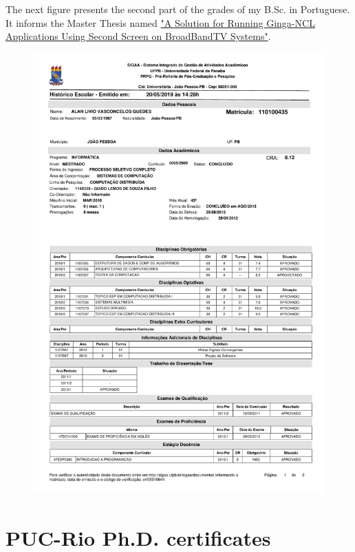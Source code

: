 \documentclass[10pt,a4paper,sans,colorlinks]{moderncv}
\begin{document}
\newpage
The next figure presents the second part of the grades of my B.Sc. in Portuguese.
It informs the Master Thesis named \href{https://repositorio.ufpb.br/jspui/handle/tede/6087}{"A Solution for Running Ginga-NCL Applications Using Second Screen on BroadBandTV Systems"}.
\vspace{1em}
\begin{figure}
    \centering
    \includegraphics[align=t,width=\textwidth,height=0.6\paperheight, keepaspectratio=true, page=2, trim=0cm 0cm 0cm 2cm]{certificates/msc-grades.pdf}
\end{figure}


\newpage
\section{PUC-Rio Ph.D. certificates}
\end{document}
